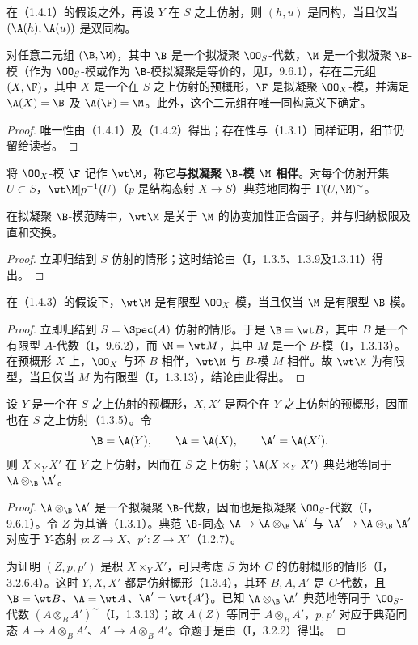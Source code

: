 在（1.4.1）的假设之外，再设 $Y$ 在 $S$ 之上仿射，则 $(h,u)$ 是同构，当且仅当 $(\A(h),\A(u))$ 是双同构。

对任意二元组 $(\B,\M)$，其中 $\B$ 是一个拟凝聚 $\OO_S$-代数，$\M$ 是一个拟凝聚 $\B$-模（作为 $\OO_S$-模或作为 $\B$-模拟凝聚是等价的，见I，9.6.1），存在二元组 $(X,\F)$，其中 $X$ 是一个在 $S$ 之上仿射的预概形，$\F$ 是拟凝聚 $\OO_X$-模，并满足
$\A(X)=\B$ 及 $\A(\F)=\M$。此外，这个二元组在唯一同构意义下确定。
\begin{proof}
唯一性由（1.4.1）及（1.4.2）得出；存在性与（1.3.1）同样证明，细节仍留给读者。
\end{proof}
将 $\OO_X$-模 $\F$ 记作 $\wt\M$，称它\textbf{与拟凝聚 $\B$-模 $\M$ 相伴}。对每个仿射开集 $U\subset S$，$\wt\M|p^{-1}(U)$（$p$ 是结构态射 $X\to S$）典范地同构于 $\Gamma(U,\M)^\sim$。

在拟凝聚 $\B$-模范畴中，$\wt\M$ 是关于 $\M$ 的协变加性正合函子，并与归纳极限及直和交换。
\begin{proof}
立即归结到 $S$ 仿射的情形；这时结论由（I，1.3.5、1.3.9及1.3.11）得出。
\end{proof}

在（1.4.3）的假设下，$\wt\M$ 是有限型 $\OO_X$-模，当且仅当 $\M$ 是有限型 $\B$-模。
\begin{proof}
立即归结到 $S=\Spec(A)$ 仿射的情形。于是 $\B=\wt B$，其中 $B$ 是一个有限型 $A$-代数（I，9.6.2），而 $\M=\wt M$，其中 $M$ 是一个 $B$-模（I，1.3.13）。
在预概形 $X$ 上，$\OO_X$ 与环 $B$ 相伴，$\wt\M$ 与 $B$-模 $M$ 相伴。故 $\wt\M$ 为有限型，当且仅当 $M$ 为有限型（I，1.3.13），结论由此得出。
\end{proof}

设 $Y$ 是一个在 $S$ 之上仿射的预概形，$X,X'$ 是两个在 $Y$ 之上仿射的预概形，因而也在 $S$ 之上仿射（1.3.5）。令
\[
\B=\A(Y),\qquad\A=\A(X),\qquad\A'=\A(X').
\]
则 $X\times_YX'$ 在 $Y$ 之上仿射，因而在 $S$ 之上仿射；$\A(X\times_YX')$ 典范地等同于 $\A\otimes_\B\A'$。
\begin{proof}
$\A\otimes_\B\A'$ 是一个拟凝聚 $\B$-代数，因而也是拟凝聚 $\OO_S$-代数（I，9.6.1）。令 $Z$ 为其谱（1.3.1）。典范 $\B$-同态
$\A\to\A\otimes_\B\A'$ 与 $\A'\to\A\otimes_\B\A'$ 对应于 $Y$-态射
$p:Z\to X$、$p':Z\to X'$（1.2.7）。

为证明 $(Z,p,p')$ 是积 $X\times_YX'$，可只考虑 $S$ 为环 $C$ 的仿射概形的情形（I，3.2.6.4）。这时 $Y,X,X'$ 都是仿射概形（1.3.4），其环 $B,A,A'$ 是 $C$-代数，且
$\B=\wt B$、$\A=\wt A$、$\A'=\wt{A'}$。已知 $\A\otimes_\B\A'$ 典范地等同于 $\OO_S$-代数 $(A\otimes_BA')^\sim$（I，1.3.13）；故 $A(Z)$ 等同于 $A\otimes_BA'$，$p,p'$ 对应于典范同态
$A\to A\otimes_BA'$、$A'\to A\otimes_BA'$。命题于是由（I，3.2.2）得出。
\end{proof}


